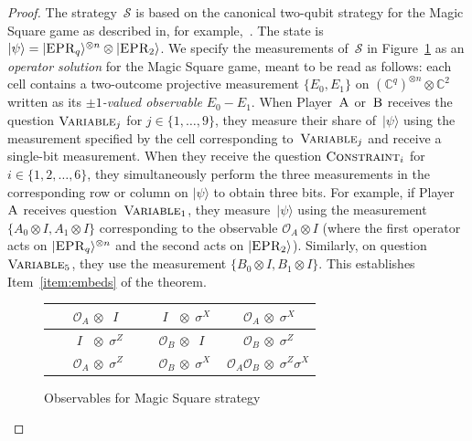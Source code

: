 \documentclass[11pt]{article}
\theoremstyle{definition}
\newcommand{\ket}[1]{|#1\rangle}
\newcommand{\C}{\ensuremath{\mathbb{C}}}
\newcommand{\strategy}{\mathscr{S}}
\newcommand{\labelstyle}[1]{\ensuremath{\textsc{#1}}\xspace}
\newcommand{\EPR}{\labelstyle{EPR}}
\newcommand{\alice}{\labelstyle{A}}
\newcommand{\bob}{\labelstyle{B}}
\newcommand{\typestyle}[1]{\ensuremath{\textsc{#1}}\xspace}
\newcommand{\Constraint}{\typestyle{Constraint}}
\newcommand{\Variable}{\typestyle{Variable}}
\renewcommand{\cal}[1]{\mathcal{#1}}
\begin{document}
\begin{proof}
  The strategy~$\strategy$ is based on the canonical two-qubit strategy for the
  Magic Square game as described in, for example,~\cite{aravind2002simple}.
  The state is $\ket{\psi} = \ket{\EPR_q}^{\otimes n} \otimes \ket{\EPR_2}$.
  We specify the measurements of~$\strategy$ in
  Figure~\ref{fig:ms-operator-soln} as an \emph{operator solution} for the Magic
  Square game, meant to be read as follows: each cell contains a two-outcome
  projective measurement $\{E_0, E_1\}$ on $(\C^q)^{\otimes n} \otimes \C^2$
  written as its \emph{$\pm 1$-valued observable} $E_0 - E_1$.
  When Player~$\alice$ or~$\bob$ receives the question $\Variable_j$ for $j \in
  \{1, \ldots, 9\}$, they measure their share of~$\ket{\psi}$ using the
  measurement specified by the cell corresponding to~$\Variable_j$ and receive a
  single-bit measurement.
  When they receive the question $\Constraint_i$ for $i \in \{1,2,\ldots,6\}$,
  they simultaneously perform the three measurements in the corresponding row or
  column on $\ket{\psi}$ to obtain three bits.
  For example, if Player~$\alice$ receives question~$\Variable_1$, they
  measure~$\ket{\psi}$ using the measurement $\{A_0 \otimes I, A_1 \otimes I\}$
  corresponding to the observable $\cal{O}_A \otimes I$ (where the first
  operator acts on $\ket{\EPR_q}^{\otimes n}$ and the second acts on
  $\ket{\EPR_2}$).
  Similarly, on question~$\Variable_5$, they use the measurement $\{B_0 \otimes
  I, B_1 \otimes I\}$.
  This establishes Item~\ref{item:embeds} of the theorem.
  \begin{figure}[ht!]
    \begin{center}
      \renewcommand{\arraystretch}{2.4}
      \begin{tabularx}{.6\textwidth}{| X | X | X |}
        \hline
        $ \phantom{I\;\;O}\cal{O}_A\, \otimes \; \;I$
        & $ \phantom{\cal{O}_BO} I\;\;\, \otimes \; \sigma^X$
        & $ \phantom{\cal{O}_B\;}\cal{O}_A\, \otimes \; \sigma^X$ \\
        \hline
        $ \phantom{\cal{O}_AO} I\;\;\, \otimes \; \sigma^Z$
        & $ \phantom{I\;\;O}\cal{O}_B\, \otimes \; \;I$
        & $ \phantom{\cal{O}_A\;}\cal{O}_B\, \otimes \; \sigma^Z$ \\
        \hline
        $ \phantom{I\;\;O}\cal{O}_A \, \otimes \; \sigma^Z$
        & $ \phantom{I\;\;O}\cal{O}_B \, \otimes \; \sigma^X$
        & $ \; \cal{O}_A \cal{O}_B \, \otimes \; \sigma^Z \sigma^X$ \\
        \hline
      \end{tabularx}
      \caption{Observables for Magic Square strategy}
      \label{fig:ms-operator-soln}
		\end{center}
  \end{figure}
  

\end{proof}
\end{document}
